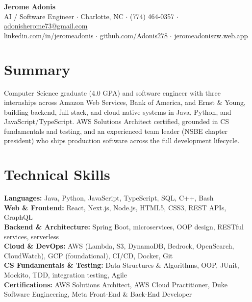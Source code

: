 \documentclass[letterpaper,10pt]{article}
\begin{document}
\begin{center}
  {\LARGE\bfseries Jerome Adonis}\\[0.3em]
  AI / Software Engineer $\cdot$ Charlotte, NC $\cdot$ (774) 464-0357 $\cdot$
  \href{mailto:adonisherome73@gmail.com}{adonisherome73@gmail.com}\\[0.2em]
  \href{https://linkedin.com/in/jeromeadonis}{linkedin.com/in/jeromeadonis} $\cdot$
  \href{https://github.com/Adonis278}{github.com/Adonis278} $\cdot$
  \href{https://jeromeadoniszw.web.app}{jeromeadoniszw.web.app}
\end{center}

\section{Summary}

Computer Science graduate (4.0 GPA) and software engineer with three internships across
Amazon Web Services, Bank of America, and Ernst \& Young, building backend, full-stack,
and cloud-native systems in Java, Python, and JavaScript/TypeScript. AWS Solutions
Architect certified, grounded in CS fundamentals and testing, and an experienced team
leader (NSBE chapter president) who ships production software across the full development
lifecycle.

\section{Technical Skills}

\textbf{Languages:} Java, Python, JavaScript, TypeScript, SQL, C++, Bash\\
\textbf{Web \& Frontend:} React, Next.js, Node.js, HTML5, CSS3, REST APIs, GraphQL\\
\textbf{Backend \& Architecture:} Spring Boot, microservices, OOP design, RESTful services, serverless\\
\textbf{Cloud \& DevOps:} AWS (Lambda, S3, DynamoDB, Bedrock, OpenSearch, CloudWatch), GCP (foundational), CI/CD, Docker, Git\\
\textbf{CS Fundamentals \& Testing:} Data Structures \& Algorithms, OOP, JUnit, Mockito, TDD, integration testing, Agile\\
\textbf{Certifications:} AWS Solutions Architect, AWS Cloud Practitioner, Duke Software Engineering, Meta Front-End \& Back-End Developer
\end{document}
